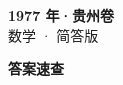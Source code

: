 \documentclass[zihao=-4, a4paper]{ctexart}
\begin{document}
\begin{center}
  {\Large\bfseries 1977 年·贵州卷}\\[4pt]
  {\large 数学 · 简答版}
\end{center}
\medskip
{}

\clearpage
{}
\begin{center}{\Large\bfseries 答案速查}\end{center}
\medskip

\end{document}
